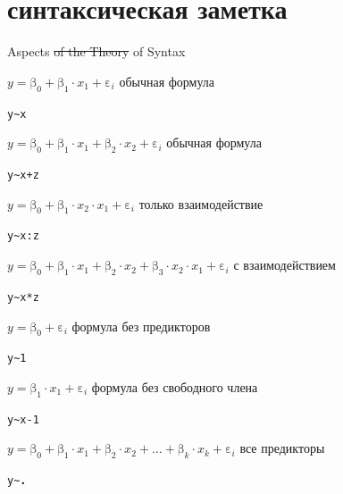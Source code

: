 \section{синтаксическая заметка}
\begin{frame}{Aspects \sout{of the Theory} of Syntax}
\begin{itemize}
\mytem $y=\mbox{β}_0+\mbox{β}_1\cdot x_1 +\mbox{ε}_i$ \hfill обычная формула\\
\scriptsize
\begin{alltt}
\alert{y\textasciitilde x}
\end{alltt}
\normalsize
\mytem $y=\mbox{β}_0+\mbox{β}_1\cdot x_1 +\mbox{β}_2\cdot x_2 +\mbox{ε}_i$ \hfill обычная формула\\
\scriptsize
\begin{alltt}
\alert{y\textasciitilde x + z}
\end{alltt}
\normalsize
\mytem $y=\mbox{β}_0+\mbox{β}_1\cdot x_2\cdot x_1 +\mbox{ε}_i$ \hfill только взаимодействие\\
\scriptsize
\begin{alltt}
\alert{y\textasciitilde x:z}
\end{alltt}
\normalsize
\mytem $y=\mbox{β}_0+\mbox{β}_1\cdot x_1 +\mbox{β}_2\cdot x_2 +\mbox{β}_3\cdot x_2\cdot x_1 +\mbox{ε}_i$ \hfill с взаимодействием\\
\scriptsize
\begin{alltt}
\alert{y\textasciitilde x*z\hfill }
\end{alltt}
\normalsize
\mytem $y=\mbox{β}_0 +\mbox{ε}_i$ \hfill формула без предикторов\\
\scriptsize
\begin{alltt}
\alert{y\textasciitilde 1}
\end{alltt}
\normalsize
\mytem $y=\mbox{β}_1\cdot x_1 +\mbox{ε}_i$ \hfill формула без свободного члена\\
\scriptsize
\begin{alltt}
\alert{y\textasciitilde x - 1}
\end{alltt}
\normalsize
\mytem $y=\mbox{β}_0+\mbox{β}_1\cdot x_1+\mbox{β}_2\cdot x_2 + \dots +\mbox{β}_k\cdot x_k +\mbox{ε}_i$ \hfill все предикторы\\
\scriptsize
\begin{alltt}
\alert{y\textasciitilde \textbf{.}}
\end{alltt}
\normalsize
\end{itemize}
\scriptsize
\begin{alltt}

\end{alltt}
\normalsize
\end{frame}

